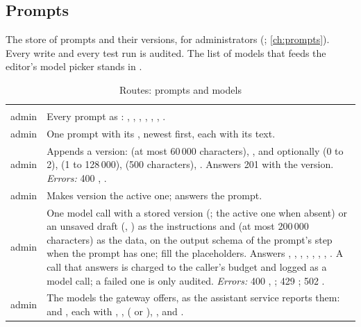 \subsection{Prompts}\label{sec:api:prompts}

The store of prompts and their versions, for administrators (;
\cref{ch:prompts}). Every write and every test run is audited. The list of models that feeds
the editor's model picker stands in .

\begin{xltabular}{\textwidth}{@{}L{19mm}Y@{}}
\caption{Routes: prompts and models}\label{tab:api:prompts}\\
\toprule {} &  \\ \midrule \endfirsthead
\toprule {} &  \\ \midrule \endhead
\bottomrule \endlastfoot
{}
admin & Every prompt as : , , ,
  , , , . \\
\addlinespace
{}
admin & One prompt with its , newest first, each with its text. \\
\addlinespace
{}
admin & Appends a version:  (at most 60\,000 characters), , and
  optionally  (0 to 2),  (1 to 128\,000),  (500
  characters), . Answers 201 with the version. \emph{Errors:} 400
  , . \\
\addlinespace
{}
admin & Makes version  the active one; answers the prompt. \\
\addlinespace
{}
admin & One model call with a stored version (; the active one when absent)
  or an unsaved draft (, ) as the instructions and  (at most
  200\,000 characters) as the data, on the output schema of the prompt's step when the prompt
  has one;  fill the
  placeholders. Answers , , , ,
  , , , . A call that answers is
  charged to the caller's budget and logged as a model call; a failed one is only audited.
  \emph{Errors:} 400 , ;
  429 ; 502 . \\
\addlinespace
{}
admin & The models the gateway offers, as the assistant service reports them: 
  and , each with , ,  ( or
  ), ,  and . \\
\end{xltabular}

